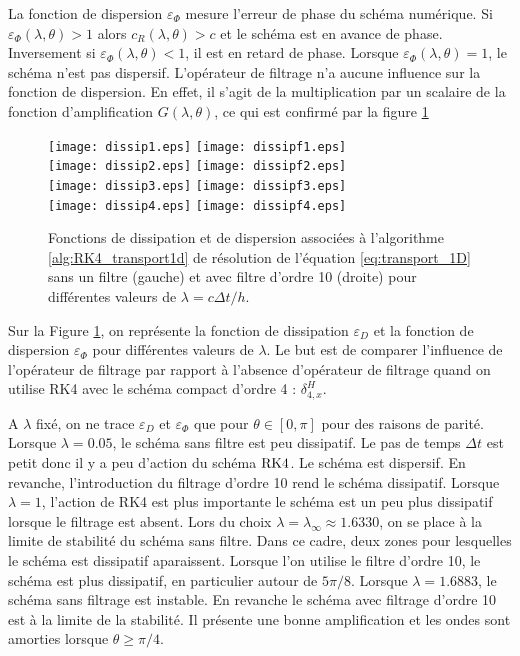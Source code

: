 La fonction de dispersion $\varepsilon_{\Phi}$ mesure l'erreur de phase du schéma numérique. Si $\varepsilon_{\Phi}(\lambda, \theta) > 1$ alors $c_R(\lambda,\theta) > c$ et le schéma est en avance de phase. Inversement si $\varepsilon_{\Phi}(\lambda, \theta) < 1$, il est en retard de phase. Lorsque $\varepsilon_{\Phi}(\lambda, \theta) = 1$, le schéma n'est pas dispersif.
L'opérateur de filtrage n'a aucune influence sur la fonction de dispersion. En effet, il s'agit de la multiplication par un scalaire de la fonction d'amplification $G(\lambda,\theta)$, ce qui est confirmé par la figure \ref{fig:dissip_disper}

\begin{figure}[htbp]
\begin{center}
\texttt{[image: dissip1.eps]}
\texttt{[image: dissipf1.eps]}\\
\texttt{[image: dissip2.eps]}
\texttt{[image: dissipf2.eps]}\\
\texttt{[image: dissip3.eps]}
\texttt{[image: dissipf3.eps]}\\
\texttt{[image: dissip4.eps]}
\texttt{[image: dissipf4.eps]}
\end{center}
\caption{Fonctions de dissipation et de dispersion associées à l'algorithme \ref{alg:RK4_transport1d} de résolution de l'équation \eqref{eq:transport_1D} sans un filtre (gauche) et avec filtre d'ordre 10 (droite) pour différentes valeurs de $\lambda = c \Delta t / h$.}
\label{fig:dissip_disper}
\end{figure}

Sur la Figure \ref{fig:dissip_disper}, on représente la fonction de dissipation $\varepsilon_D$ et la fonction de dispersion $\varepsilon_{\Phi}$ pour différentes valeurs de $\lambda$. Le but est de comparer l'influence de l'opérateur de filtrage par rapport à l'absence d'opérateur de filtrage quand on utilise RK4 avec le schéma compact d'ordre 4 : $\delta_{4,x}^H$.

A $\lambda$ fixé, on ne trace $\varepsilon_D$ et $\varepsilon_{\Phi}$ que pour $\theta \in [0, \pi]$ pour des raisons de parité. Lorsque $\lambda=0.05$, le schéma sans filtre est peu dissipatif. Le pas de temps $\Delta t$ est petit donc il y a peu d'action du schéma $\RK4$. Le schéma est dispersif. En revanche, l'introduction du filtrage d'ordre 10 rend le schéma dissipatif. Lorsque $\lambda =1$, l'action de RK4 est plus importante le schéma est un peu plus dissipatif lorsque le filtrage est absent.
Lors du choix $\lambda = \lambda_{\infty} \approx 1.6330$, on se place à la limite de stabilité du schéma sans filtre. Dans ce cadre, deux zones pour lesquelles le schéma est dissipatif aparaissent. Lorsque l'on utilise le filtre d'ordre 10, le schéma est plus dissipatif, en particulier autour de $5 \pi/8$.
Lorsque $\lambda = 1.6883$, le schéma sans filtrage est instable. En revanche le schéma avec filtrage d'ordre 10 est à la limite de la stabilité. Il présente une bonne amplification et les ondes sont amorties lorsque $\theta \geq \pi/4$.







